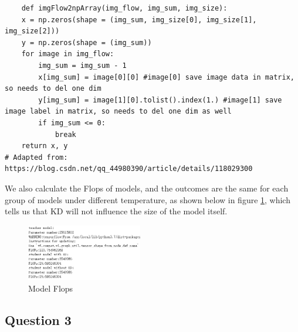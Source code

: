 \documentclass[conference]{IEEEtran}
\begin{document}
\begin{lstlisting}
	def imgFlow2npArray(img_flow, img_sum, img_size):
    x = np.zeros(shape = (img_sum, img_size[0], img_size[1], img_size[2]))
    y = np.zeros(shape = (img_sum))
    for image in img_flow:
        img_sum = img_sum - 1
        x[img_sum] = image[0][0] #image[0] save image data in matrix, so needs to del one dim
        y[img_sum] = image[1][0].tolist().index(1.) #image[1] save image label in matrix, so needs to del one dim as well
        if img_sum <= 0:
            break
    return x, y
# Adapted from: https://blog.csdn.net/qq_44980390/article/details/118029300
\end{lstlisting}

We also calculate the Flops of models, and the outcomes are the same for each group of models under different temperature, as shown below in figure \ref{flops-2}, which tells us that KD will not influence the size of the model itself.

\begin{figure}[h] 
    \centering
    \includegraphics[width=0.45\textwidth]{./graphs/Task2/flops.png}
    \caption{Model Flops}
    \label{flops-2}
\end{figure}

\subsection{Question 3} %
\end{document}
